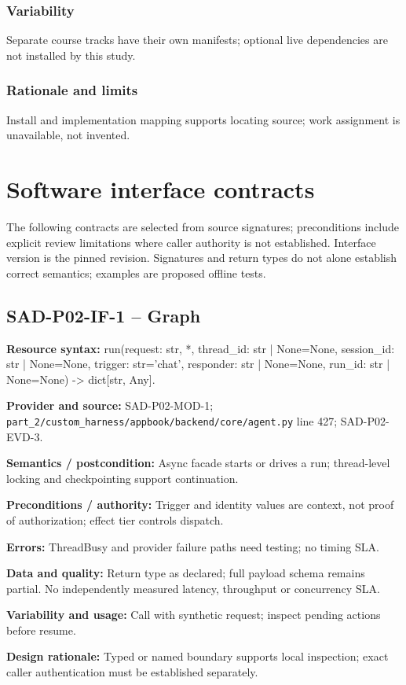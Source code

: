 \documentclass[10pt,letterpaper]{article}
\begin{document}
\subsubsection{Variability}
Separate course tracks have their own manifests; optional live dependencies are not installed by this study.
\subsubsection{Rationale and limits}
Install and implementation mapping supports locating source; work assignment is unavailable, not invented.

\section{Software interface contracts}
The following contracts are selected from source signatures; preconditions include explicit review limitations where caller authority is not established. Interface version is the pinned revision. Signatures and return types do not alone establish correct semantics; examples are proposed offline tests.
\subsection{SAD-P02-IF-1 -- Graph}
{\raggedright \textbf{Resource syntax:} run(\allowbreak{}request: str, *, thread\_\allowbreak{}id: str | None=None, session\_\allowbreak{}id: str | None=None, trigger: str='chat', responder: str | None=None, run\_\allowbreak{}id: str | None=None) -> dict[str, Any].\par}
\textbf{Provider and source:} SAD-P02-MOD-1; \nolinkurl{part_2/custom_harness/appbook/backend/core/agent.py} line 427; SAD-P02-EVD-3.\par
\textbf{Semantics / postcondition:} Async facade starts or drives a run; thread-level locking and checkpointing support continuation.\par
\textbf{Preconditions / authority:} Trigger and identity values are context, not proof of authorization; effect tier controls dispatch.\par
\textbf{Errors:} ThreadBusy and provider failure paths need testing; no timing SLA.\par
\textbf{Data and quality:} Return type as declared; full payload schema remains partial. No independently measured latency, throughput or concurrency SLA.\par
\textbf{Variability and usage:} Call with synthetic request; inspect pending actions before resume.\par
\textbf{Design rationale:} Typed or named boundary supports local inspection; exact caller authentication must be established separately.\par
\end{document}
